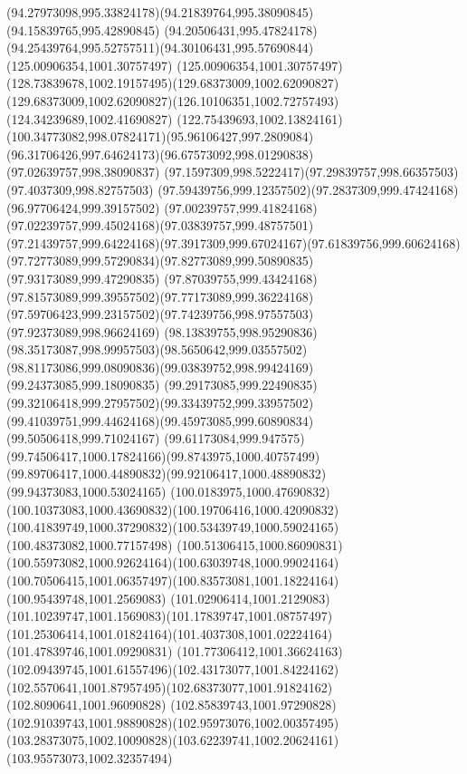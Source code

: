 {{  \curveto(94.27973098,995.33824178)(94.21839764,995.38090845)(94.15839765,995.42890845)
  \curveto(94.20506431,995.47824178)(94.25439764,995.52757511)(94.30106431,995.57690844)
  \lineto(125.00906354,1001.30757497)
  \curveto(125.00906354,1001.30757497)(128.73839678,1002.19157495)(129.68373009,1002.62090827)
  \curveto(129.68373009,1002.62090827)(126.10106351,1002.72757493)(124.34239689,1002.41690827)
  \curveto(122.75439693,1002.13824161)(100.34773082,998.07824171)(95.96106427,997.2809084)
  \curveto(96.31706426,997.64624173)(96.67573092,998.01290838)(97.02639757,998.38090837)
  \curveto(97.1597309,998.5222417)(97.29839757,998.66357503)(97.4037309,998.82757503)
  \curveto(97.59439756,999.12357502)(97.2837309,999.47424168)(96.97706424,999.39157502)
  \curveto(97.00239757,999.41824168)(97.02239757,999.45024168)(97.03839757,999.48757501)
  \curveto(97.21439757,999.64224168)(97.3917309,999.67024167)(97.61839756,999.60624168)
  \curveto(97.72773089,999.57290834)(97.82773089,999.50890835)(97.93173089,999.47290835)
  \curveto(97.87039755,999.43424168)(97.81573089,999.39557502)(97.77173089,999.36224168)
  \curveto(97.59706423,999.23157502)(97.74239756,998.97557503)(97.92373089,998.96624169)
  \curveto(98.13839755,998.95290836)(98.35173087,998.99957503)(98.5650642,999.03557502)
  \curveto(98.81173086,999.08090836)(99.03839752,998.99424169)(99.24373085,999.18090835)
  \curveto(99.29173085,999.22490835)(99.32106418,999.27957502)(99.33439752,999.33957502)
  \curveto(99.41039751,999.44624168)(99.45973085,999.60890834)(99.50506418,999.71024167)
  \curveto(99.61173084,999.947575)(99.74506417,1000.17824166)(99.8743975,1000.40757499)
  \curveto(99.89706417,1000.44890832)(99.92106417,1000.48890832)(99.94373083,1000.53024165)
  \curveto(100.0183975,1000.47690832)(100.10373083,1000.43690832)(100.19706416,1000.42090832)
  \curveto(100.41839749,1000.37290832)(100.53439749,1000.59024165)(100.48373082,1000.77157498)
  \curveto(100.51306415,1000.86090831)(100.55973082,1000.92624164)(100.63039748,1000.99024164)
  \curveto(100.70506415,1001.06357497)(100.83573081,1001.18224164)(100.95439748,1001.2569083)
  \curveto(101.02906414,1001.2129083)(101.10239747,1001.1569083)(101.17839747,1001.08757497)
  \curveto(101.25306414,1001.01824164)(101.4037308,1001.02224164)(101.47839746,1001.09290831)
  \curveto(101.77306412,1001.36624163)(102.09439745,1001.61557496)(102.43173077,1001.84224162)
  \curveto(102.5570641,1001.87957495)(102.68373077,1001.91824162)(102.8090641,1001.96090828)
  \curveto(102.85839743,1001.97290828)(102.91039743,1001.98890828)(102.95973076,1002.00357495)
  \curveto(103.28373075,1002.10090828)(103.62239741,1002.20624161)(103.95573073,1002.32357494)
}}
